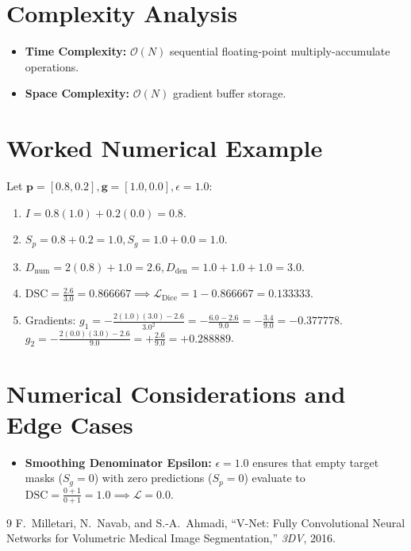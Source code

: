 \documentclass[11pt]{article}
\begin{document}
\section{Complexity Analysis}
\label{sec:complexity}

\begin{itemize}
    \item \textbf{Time Complexity:} $\mathcal{O}(N)$ sequential floating-point multiply-accumulate operations.
    \item \textbf{Space Complexity:} $\mathcal{O}(N)$ gradient buffer storage.
\end{itemize}

\section{Worked Numerical Example}
\label{sec:worked_example}

Let $\mathbf{p} = [0.8, 0.2], \mathbf{g} = [1.0, 0.0], \epsilon = 1.0$:
\begin{enumerate}
    \item $I = 0.8(1.0) + 0.2(0.0) = 0.8$.
    \item $S_p = 0.8 + 0.2 = 1.0, S_g = 1.0 + 0.0 = 1.0$.
    \item $D_{\mathrm{num}} = 2(0.8) + 1.0 = 2.6, D_{\mathrm{den}} = 1.0 + 1.0 + 1.0 = 3.0$.
    \item $\mathrm{DSC} = \frac{2.6}{3.0} = 0.866667 \implies \mathcal{L}_{\mathrm{Dice}} = 1 - 0.866667 = 0.133333$.
    \item Gradients:
    $g_1 = -\frac{2(1.0)(3.0) - 2.6}{3.0^2} = -\frac{6.0 - 2.6}{9.0} = -\frac{3.4}{9.0} = -0.377778$.
    $g_2 = -\frac{2(0.0)(3.0) - 2.6}{9.0} = +\frac{2.6}{9.0} = +0.288889$.
\end{enumerate}

\section{Numerical Considerations and Edge Cases}
\label{sec:numerical}

\begin{itemize}
    \item \textbf{Smoothing Denominator Epsilon:} $\epsilon = 1.0$ ensures that empty target masks ($S_g = 0$) with zero predictions ($S_p = 0$) evaluate to $\mathrm{DSC} = \frac{0 + 1}{0 + 1} = 1.0 \implies \mathcal{L} = 0.0$.
\end{itemize}

\begin{thebibliography}{9}
 F.~Milletari, N.~Navab, and S.-A.~Ahmadi, ``V-Net: Fully Convolutional Neural Networks for Volumetric Medical Image Segmentation,'' \emph{3DV}, 2016.
\end{thebibliography}
\end{document}
